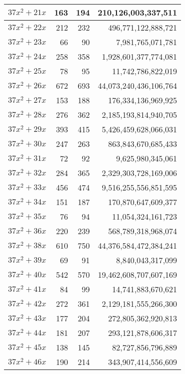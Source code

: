 \documentclass[a4paper]{amsproc}
\theoremstyle{plain}
\theoremstyle{named}
\begin{document}
\begin{longtable}{ | l | r | r | r | }
$37x^2 + 21x$ & 163 & 194 & 210{,}126{,}003{,}337{,}511 \\ \hline
$37x^2 + 22x$ & 212 & 232 & 496{,}771{,}122{,}888{,}721 \\ \hline
$37x^2 + 23x$ & 66 & 90 & 7{,}981{,}765{,}071{,}781 \\ \hline
$37x^2 + 24x$ & 258 & 358 & 1{,}928{,}601{,}377{,}774{,}081 \\ \hline
$37x^2 + 25x$ & 78 & 95 & 11{,}742{,}786{,}822{,}019 \\ \hline
$37x^2 + 26x$ & 672 & 693 & 44{,}073{,}240{,}436{,}106{,}764 \\ \hline
$37x^2 + 27x$ & 153 & 188 & 176{,}334{,}136{,}969{,}925 \\ \hline
$37x^2 + 28x$ & 276 & 362 & 2{,}185{,}193{,}814{,}940{,}705 \\ \hline
$37x^2 + 29x$ & 393 & 415 & 5{,}426{,}459{,}628{,}066{,}031 \\ \hline
$37x^2 + 30x$ & 247 & 263 & 863{,}843{,}670{,}685{,}433 \\ \hline
$37x^2 + 31x$ & 72 & 92 & 9{,}625{,}980{,}345{,}061 \\ \hline
$37x^2 + 32x$ & 284 & 365 & 2{,}329{,}303{,}728{,}169{,}006 \\ \hline
$37x^2 + 33x$ & 456 & 474 & 9{,}516{,}255{,}556{,}851{,}595 \\ \hline
$37x^2 + 34x$ & 151 & 187 & 170{,}870{,}647{,}609{,}377 \\ \hline
$37x^2 + 35x$ & 76 & 94 & 11{,}054{,}324{,}161{,}723 \\ \hline
$37x^2 + 36x$ & 220 & 239 & 568{,}789{,}318{,}968{,}074 \\ \hline
$37x^2 + 38x$ & 610 & 750 & 44{,}376{,}584{,}472{,}384{,}241 \\ \hline
$37x^2 + 39x$ & 69 & 91 & 8{,}840{,}043{,}317{,}099 \\ \hline
$37x^2 + 40x$ & 542 & 570 & 19{,}462{,}608{,}707{,}607{,}169 \\ \hline
$37x^2 + 41x$ & 84 & 99 & 14{,}741{,}883{,}670{,}621 \\ \hline
$37x^2 + 42x$ & 272 & 361 & 2{,}129{,}181{,}555{,}266{,}300 \\ \hline
$37x^2 + 43x$ & 177 & 204 & 272{,}805{,}362{,}920{,}813 \\ \hline
$37x^2 + 44x$ & 181 & 207 & 293{,}121{,}878{,}606{,}317 \\ \hline
$37x^2 + 45x$ & 138 & 145 & 82{,}727{,}856{,}796{,}889 \\ \hline
$37x^2 + 46x$ & 190 & 214 & 343{,}907{,}414{,}556{,}609 \\ \hline

\end{longtable}
\end{document}
